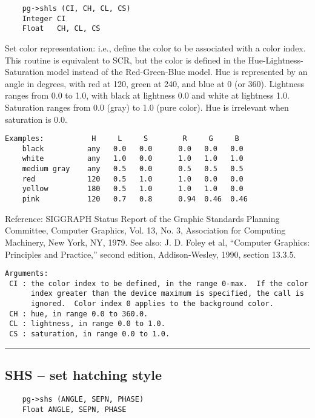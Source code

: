 \begin{verbatim}
    pg->shls (CI, CH, CL, CS)
    Integer CI
    Float   CH, CL, CS
\end{verbatim}

Set color representation: i.e., define the color to be associated with
a color index.  This routine is equivalent to SCR, but the color is
defined in the Hue-Lightness-Saturation model instead of the
Red-Green-Blue model.  Hue is represented by an angle in degrees, with
red at 120, green at 240, and blue at 0 (or 360).  Lightness ranges
from 0.0 to 1.0, with black at lightness 0.0 and white at lightness
1.0.  Saturation ranges from 0.0 (gray) to 1.0 (pure color).  Hue is
irrelevant when saturation is 0.0.

\begin{verbatim}
Examples:           H     L     S        R     G     B
    black          any   0.0   0.0      0.0   0.0   0.0
    white          any   1.0   0.0      1.0   1.0   1.0
    medium gray    any   0.5   0.0      0.5   0.5   0.5
    red            120   0.5   1.0      1.0   0.0   0.0
    yellow         180   0.5   1.0      1.0   1.0   0.0
    pink           120   0.7   0.8      0.94  0.46  0.46
\end{verbatim}

Reference: SIGGRAPH Status Report of the Graphic Standards Planning
Committee, Computer Graphics, Vol. 13, No. 3, Association for
Computing Machinery, New York, NY, 1979.  See also: J. D. Foley et al,
``Computer Graphics: Principles and Practice,'' second edition,
Addison-Wesley, 1990, section 13.3.5.

\begin{verbatim}
Arguments:
 CI : the color index to be defined, in the range 0-max.  If the color
      index greater than the device maximum is specified, the call is
      ignored.  Color index 0 applies to the background color. 
 CH : hue, in range 0.0 to 360.0.
 CL : lightness, in range 0.0 to 1.0.
 CS : saturation, in range 0.0 to 1.0.
\end{verbatim}

\hrule

\subsection*{SHS -- set hatching style }

\begin{verbatim}
    pg->shs (ANGLE, SEPN, PHASE)
    Float ANGLE, SEPN, PHASE
\end{verbatim}

